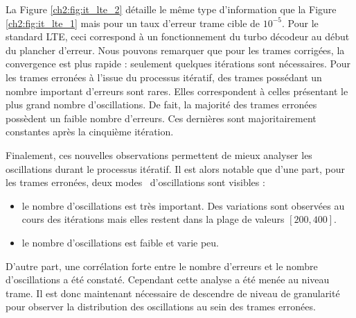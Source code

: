 La Figure \ref{ch2:fig:it_lte_2} détaille le même type d'information que la Figure \ref{ch2:fig:it_lte_1} mais pour un 
taux d'erreur trame cible de $10^{-5}$. Pour le standard LTE, ceci correspond à un fonctionnement du 
turbo décodeur au début du plancher d'erreur. Nous pouvons remarquer que pour les trames corrigées, la convergence est 
plus rapide : seulement quelques itérations sont nécessaires. Pour les trames erronées à l'issue 
du processus itératif, des trames possédant un nombre important d'erreurs sont rares. Elles correspondent à celles 
présentant le plus grand nombre d'oscillations. De fait, la majorité des trames erronées possèdent un faible nombre 
d'erreurs. Ces dernières sont majoritairement constantes après la cinquième itération.

Finalement, ces nouvelles observations permettent de mieux analyser les oscillations durant le processus itératif. Il est alors 
notable que d'une part, pour les trames erronées, deux \og modes \fg ~d'oscillations sont visibles :
\begin{itemize}
	\item le nombre d'oscillations est très important. Des variations sont observées au cours des itérations mais elles 
	restent dans la plage de valeurs $[200,400]$.
	\item le nombre d'oscillations est faible et varie peu.
\end{itemize}

D'autre part, une corrélation forte entre le nombre d'erreurs et le nombre d'oscillations a été constaté. Cependant 
cette analyse a été menée au niveau trame. Il est donc maintenant nécessaire de descendre de niveau de granularité pour observer 
la distribution des oscillations au sein des trames erronées.

